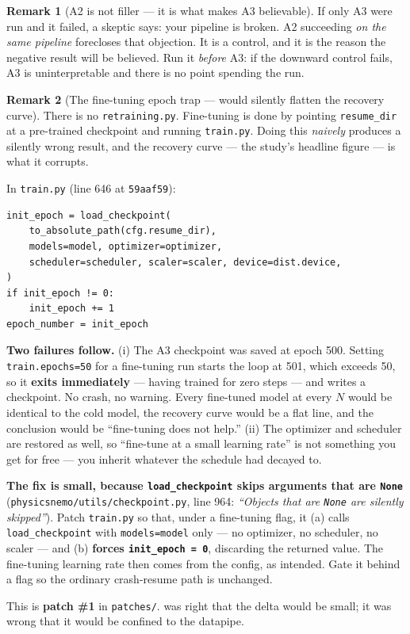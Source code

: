 \documentclass[10pt,a4paper]{article}
\theoremstyle{definition}
\newtheorem{remark}{Remark}[section]
\begin{document}
\begin{remark}[A2 is not filler --- it is what makes A3 believable]
If only A3 were run and it failed, a skeptic says: your pipeline is broken. A2
succeeding \emph{on the same pipeline} forecloses that objection. It is a control,
and it is the reason the negative result will be believed. Run it \emph{before} A3:
if the downward control fails, A3 is uninterpretable and there is no point spending
the run.
\end{remark}

\begin{remark}[The fine-tuning epoch trap --- would silently flatten the recovery curve]
\label{rem:epochtrap}
There is no \texttt{retraining.py}. Fine-tuning is done by pointing \texttt{resume\_dir}
at a pre-trained checkpoint and running \texttt{train.py}. Doing this \emph{naively}
produces a silently wrong result, and the recovery curve --- the study's headline figure
--- is what it corrupts.

In \texttt{train.py} (line 646 at \texttt{59aaf59}):
\begin{lstlisting}
init_epoch = load_checkpoint(
    to_absolute_path(cfg.resume_dir),
    models=model, optimizer=optimizer,
    scheduler=scheduler, scaler=scaler, device=dist.device,
)
if init_epoch != 0:
    init_epoch += 1
epoch_number = init_epoch
\end{lstlisting}

\textbf{Two failures follow.} (i) The A3 checkpoint was saved at epoch 500. Setting
\texttt{train.epochs=50} for a fine-tuning run starts the loop at 501, which exceeds 50,
so it \textbf{exits immediately} --- having trained for zero steps --- and writes a
checkpoint. No crash, no warning. Every fine-tuned model at every $N$ would be identical
to the cold model, the recovery curve would be a flat line, and the conclusion would be
``fine-tuning does not help.'' (ii) The optimizer and scheduler are restored as well, so
``fine-tune at a small learning rate'' is not something you get for free --- you inherit
whatever the schedule had decayed to.

\textbf{The fix is small, because \texttt{load\_checkpoint} skips arguments that are
\texttt{None}} (\texttt{physicsnemo/utils/checkpoint.py}, line 964: \emph{``Objects that
are \texttt{None} are silently skipped''}). Patch \texttt{train.py} so that, under a
fine-tuning flag, it (a) calls \texttt{load\_checkpoint} with \texttt{models=model} only
--- no optimizer, no scheduler, no scaler --- and (b) \textbf{forces
\texttt{init\_epoch = 0}}, discarding the returned value. The fine-tuning learning rate
then comes from the config, as intended. Gate it behind a flag so the ordinary
crash-resume path is unchanged.

This is \textbf{patch \#1} in \texttt{patches/}.  was right that the
delta would be small; it was wrong that it would be confined to the datapipe.
\end{remark}
\end{document}
